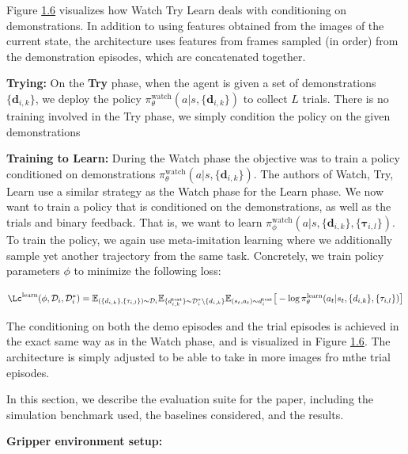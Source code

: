 \documentclass[
  letterpaper,
  DIV=11,
  numbers=noendperiod,
  oneside]{scrreprt}
\theoremstyle{remark}
\begin{document}
Figure \hyperref[fig:watch-try-learn-arch]{1.6} visualizes how Watch Try
Learn deals with conditioning on demonstrations. In addition to using
features obtained from the images of the current state, the architecture
uses features from frames sampled (in order) from the demonstration
episodes, which are concatenated together.

\textbf{Trying:} On the \textbf{Try} phase, when the agent is given a
set of demonstrations \(\{\textbf{d}_{i,k}\}\), we deploy the policy
\(\pi_\theta^{\text{watch}}(a | s, \{\textbf{d}_{i,k}\})\) to collect
\(L\) trials. There is no training involved in the Try phase, we simply
condition the policy on the given demonstrations

\textbf{Training to Learn:} During the Watch phase the objective was to
train a policy conditioned on demonstrations
\(\pi_\theta^{\text{watch}}(a | s, \{\textbf{d}_{i,k}\})\). The authors
of Watch, Try, Learn use a similar strategy as the Watch phase for the
Learn phase. We now want to train a policy that is conditioned on the
demonstrations, as well as the trials and binary feedback. That is, we
want to learn
\(\pi_\phi^{\text{watch}}(a | s, \{\textbf{d}_{i,k}\}, \{\mathbf{\tau}_{i, l}\})\).
To train the policy, we again use meta-imitation learning where we
additionally sample yet another trajectory from the same task.
Concretely, we train policy parameters \(\phi\) to minimize the
following loss:

\(\Lc^{\text{learn}}(\phi, \mathcal{D}_i, \mathcal{D}_i^*) = \mathbb{E}_{(\{d_{i,k}\}, \{\mathbf{\tau}_{i,l}\}) \sim \mathcal{D}_i} \mathbb{E}_{\{d_{i,k}^{\text{test}}\} \sim \mathcal{D}_i^* \text{\textbackslash} \{d_{i,k}\}} \mathbb{E}_{(s_t, a_t) \sim d_i^{\text{test}}} \big[
- \log \pi_\theta^{\text{learn}} (a_t | s_t, \{d_{i,k}\}, \{\tau_{i,l}\}) \big]\)

The conditioning on both the demo episodes and the trial episodes is
achieved in the exact same way as in the Watch phase, and is visualized
in Figure \hyperref[fig:watch-try-learn-arch]{1.6}. The architecture is
simply adjusted to be able to take in more images fro mthe trial
episodes.

In this section, we describe the evaluation suite for the paper,
including the simulation benchmark used, the baselines considered, and
the results.

\textbf{Gripper environment setup:}
\end{document}
